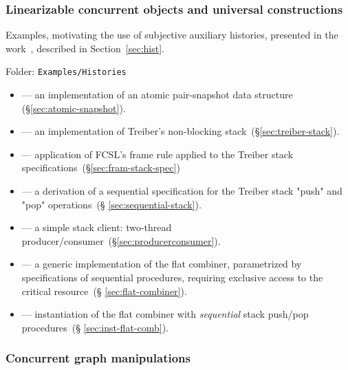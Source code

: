 \subsubsection{Linearizable concurrent objects and universal
  constructions}
\label{sec:line-conc-objects}

Examples, motivating the use of subjective auxiliary histories,
presented in the work~\cite{Sergey-al:ESOP15}, described in
Section~\ref{sec:hist}.

Folder: \texttt{Examples/Histories}

\begin{itemize}

\item {} --- an implementation of an atomic
  pair-snapshot data structure (\S \ref{sec:atomic-snapshot}).

\item {} --- an implementation of Treiber's non-blocking
  stack~(\S \ref{sec:treiber-stack}).

\item {} --- application of FCSL's frame rule applied to the Treiber
  stack specifications~(\S \ref{sec:fram-stack-spec})

\item {} --- a derivation of a sequential specification
  for the Treiber stack "push" and "pop" operations~(\S
  \ref{sec:sequential-stack}).

\item {} --- a simple stack client: two-thread
  producer/consumer~(\S \ref{sec:producerconsumer}).

\item {} --- a generic implementation of the flat
  combiner, parametrized by specifications of sequential procedures,
  requiring exclusive access to the critical resource~(\S
  \ref{sec:flat-combiner}).

\item {} --- instantiation of the flat combiner
  with \emph{sequential} stack push/pop procedures~(\S
  \ref{sec:inst-flat-comb}).

\end{itemize}

\subsubsection{Concurrent graph manipulations}
\label{sec:conc-graph-manip}

